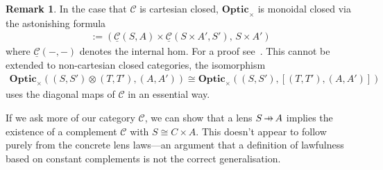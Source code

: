 \documentclass[11pt,letterpaper]{article}
\theoremstyle{plain}
\theoremstyle{definition}
\newtheorem{remark}[theorem]{Remark}
\newcommand{\C}{\mathscr{C}}
\newcommand{\homC}{\underline{\C}}
\newcommand{\Optic}{\mathbf{Optic}}
\newcommand{\hto}{\ensuremath{\,\mathaccent\shortmid\rightarrow\,}}
\begin{document}
\begin{remark}
  In the case that $\C$ is cartesian closed, $\Optic_\times$ is monoidal closed via the astonishing formula
  \begin{align*}
    [(S, S'), (A, A')] := (\homC(S, A) \times \homC(S \times A', S'), \, S \times A')
  \end{align*}
  where $\homC(-, -)$ denotes the internal hom. For a proof see~\cite[Section 1.2]{DialecticaCategories}. This cannot be extended to non-cartesian closed categories, the isomorphism
  \begin{align*}
    \Optic_\times((S, S') \otimes (T, T'), (A, A')) \cong \Optic_\times((S, S'),  [(T, T'), (A, A')])
  \end{align*}
  uses the diagonal maps of $\C$ in an essential way.
\end{remark}

If we ask more of our category $\C$, we can show that a lens $S \hto A$ implies the existence of a complement $\C$ with $S \cong C \times A$. This doesn't appear to follow purely from the concrete lens laws---an argument that a definition of lawfulness based on constant complements is not the correct generalisation.
\end{document}

